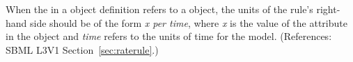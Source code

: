 When the  in a \RateRule object definition refers to a
\Compartment object, the units of the rule's right-hand side should be of
the form \emph{x per time}, where \emph{x} is the value of the
 attribute in the \Compartment object and \emph{time} refers
to the units of time for the model.  (References: SBML L3V1
Section~\ref{sec:raterule}.)
